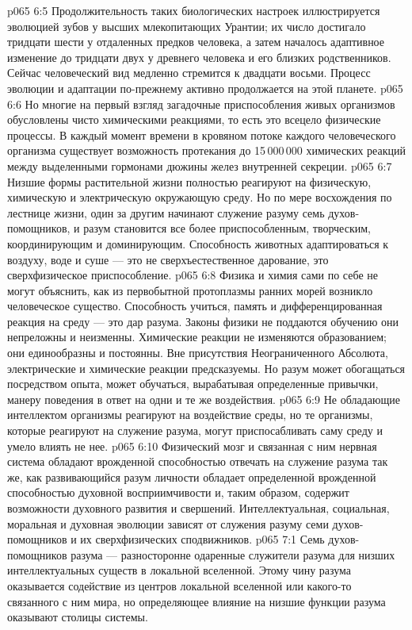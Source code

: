 \vs p065 6:5 Продолжительность таких биологических настроек иллюстрируется эволюцией зубов у высших млекопитающих Урантии; их число достигало тридцати шести у отдаленных предков человека, а затем началось адаптивное изменение до тридцати двух у древнего человека и его близких родственников. Сейчас человеческий вид медленно стремится к двадцати восьми. Процесс эволюции и адаптации по\hyp{}прежнему активно продолжается на этой планете.
\vs p065 6:6 Но многие на первый взгляд загадочные приспособления живых организмов обусловлены чисто химическими реакциями, то есть это всецело физические процессы. В каждый момент времени в кровяном потоке каждого человеческого организма существует возможность протекания до 15\,000\,000 химических реакций между выделенными гормонами дюжины желез внутренней секреции.
\vs p065 6:7 \pc Низшие формы растительной жизни полностью реагируют на физическую, химическую и электрическую окружающую среду. Но по мере восхождения по лестнице жизни, один за другим начинают служение разуму семь духов\hyp{}помощников, и разум становится все более приспособленным, творческим, координирующим и доминирующим. Способность животных адаптироваться к воздуху, воде и суше --- это не сверхъестественное дарование, это сверхфизическое приспособление.
\vs p065 6:8 Физика и химия сами по себе не могут объяснить, как из первобытной протоплазмы ранних морей возникло человеческое существо. Способность учиться, память и дифференцированная реакция на среду --- это дар разума. Законы физики не поддаются обучению они непреложны и неизменны. Химические реакции не изменяются образованием; они единообразны и постоянны. Вне присутствия Неограниченного Абсолюта, электрические и химические реакции предсказуемы. Но разум может обогащаться посредством опыта, может обучаться, вырабатывая определенные привычки, манеру поведения в ответ на одни и те же воздействия.
\vs p065 6:9 Не обладающие интеллектом организмы реагируют на воздействие среды, но те организмы, которые реагируют на служение разума, могут приспосабливать саму среду и умело влиять не нее.
\vs p065 6:10 Физический мозг и связанная с ним нервная система обладают врожденной способностью отвечать на служение разума так же, как развивающийся разум личности обладает определенной врожденной способностью духовной восприимчивости и, таким образом, содержит возможности духовного развития и свершений. Интеллектуальная, социальная, моральная и духовная эволюции зависят от служения разуму семи духов\hyp{}помощников и их сверхфизических сподвижников.
\vs p065 7:1 Семь духов\hyp{}помощников разума --- разносторонне одаренные служители разума для низших интеллектуальных существ в локальной вселенной. Этому чину разума оказывается содействие из центров локальной вселенной или какого\hyp{}то связанного с ним мира, но определяющее влияние на низшие функции разума оказывают столицы системы.
